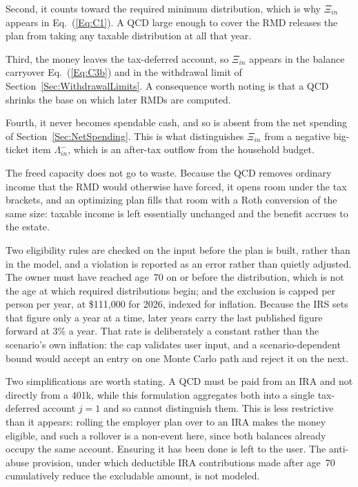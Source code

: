 \documentclass[fleqn,12pt]{report}
\begin{document}
	Second, it counts toward the required minimum distribution, which is why
	$\Xi_{in}$ appears in Eq.~(\ref{Eq:C1}). A QCD large enough to cover the RMD
	releases the plan from taking any taxable distribution at all that year.

	Third, the money leaves the tax-deferred account, so $\Xi_{in}$ appears in the
	balance carryover Eq.~(\ref{Eq:C3b}) and in the withdrawal limit of
	Section~\ref{Sec:WithdrawalLimits}. A consequence worth noting is that a QCD
	shrinks the base on which later RMDs are computed.

	Fourth, it never becomes spendable cash, and so is absent from the net spending
	of Section~\ref{Sec:NetSpending}. This is what distinguishes $\Xi_{in}$ from a
	negative big-ticket item $\Lambda^-_{in}$, which is an after-tax outflow from
	the household budget.

	The freed capacity does not go to waste. Because the QCD removes ordinary income
	that the RMD would otherwise have forced, it opens room under the tax brackets,
	and an optimizing plan fills that room with a Roth conversion of the same size:
	taxable income is left essentially unchanged and the benefit accrues to the estate.

	Two eligibility rules are checked on the input before the plan is built, rather
	than in the model, and a violation is reported as an error rather than quietly
	adjusted. The owner must have reached age~70\textonehalf{} on or before the
	distribution, which is not the age at which required distributions begin; and the
	exclusion is capped per person per year, at \$111,000 for 2026, indexed for
	inflation. Because the IRS sets that figure only a year at a time, later years
	carry the last published figure forward at 3\% a year. That rate is deliberately a
	constant rather than the scenario's own inflation: the cap validates user input,
	and a scenario-dependent bound would accept an entry on one Monte Carlo path and
	reject it on the next.

	Two simplifications are worth stating. A QCD must be paid from an IRA and not
	directly from a 401k, while this formulation aggregates both into a single
	tax-deferred account $j=1$ and so cannot distinguish them. This is less
	restrictive than it appears: rolling the employer plan over to an IRA makes the
	money eligible, and such a rollover is a non-event here, since both balances
	already occupy the same account. Ensuring it has been done is left to the user.
	The anti-abuse provision, under which deductible IRA contributions made after
	age~70\textonehalf{} cumulatively reduce the excludable amount, is not modeled.
\end{document}

